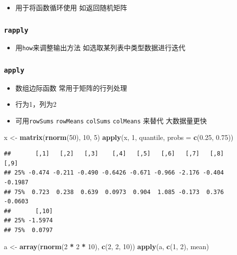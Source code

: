 \documentclass[]{book}
\newenvironment{Shaded}{\begin{snugshade}}{\end{snugshade}}
\newcommand{\DataTypeTok}[1]{\textcolor[rgb]{0.13,0.29,0.53}{#1}}
\newcommand{\DecValTok}[1]{\textcolor[rgb]{0.00,0.00,0.81}{#1}}
\newcommand{\FloatTok}[1]{\textcolor[rgb]{0.00,0.00,0.81}{#1}}
\newcommand{\KeywordTok}[1]{\textcolor[rgb]{0.13,0.29,0.53}{\textbf{#1}}}
\newcommand{\NormalTok}[1]{#1}
\newcommand{\OperatorTok}[1]{\textcolor[rgb]{0.81,0.36,0.00}{\textbf{#1}}}
\newcommand{\StringTok}[1]{\textcolor[rgb]{0.31,0.60,0.02}{#1}}
\providecommand{\tightlist}{%
  \setlength{\itemsep}{0pt}\setlength{\parskip}{0pt}}
\begin{document}
\begin{itemize}
\tightlist
\item
  用于将函数循环使用 如返回随机矩阵
\end{itemize}

\hypertarget{rapply}{%
\subsubsection{\texorpdfstring{\texttt{rapply}}{rapply}}\label{rapply}}

\begin{itemize}
\tightlist
\item
  用\texttt{how}来调整输出方法 如选取某列表中类型数据进行迭代
\end{itemize}

\hypertarget{apply}{%
\subsubsection{\texorpdfstring{\texttt{apply}}{apply}}\label{apply}}

\begin{itemize}
\tightlist
\item
  数组边际函数 常用于矩阵的行列处理
\item
  行为1，列为2
\item
  可用\texttt{rowSums} \texttt{rowMeans} \texttt{colSums} \texttt{colMeans} 来替代 大数据量更快
\end{itemize}

\begin{Shaded}
\begin{Highlighting}[]
\NormalTok{x <-}\StringTok{ }\KeywordTok{matrix}\NormalTok{(}\KeywordTok{rnorm}\NormalTok{(}\DecValTok{50}\NormalTok{), }\DecValTok{10}\NormalTok{, }\DecValTok{5}\NormalTok{)}
\KeywordTok{apply}\NormalTok{(x, }\DecValTok{1}\NormalTok{, quantile, }\DataTypeTok{probs =} \KeywordTok{c}\NormalTok{(}\FloatTok{0.25}\NormalTok{, }\FloatTok{0.75}\NormalTok{))}
\end{Highlighting}
\end{Shaded}

\begin{verbatim}
##       [,1]   [,2]   [,3]    [,4]   [,5]   [,6]   [,7]   [,8]    [,9]
## 25% -0.474 -0.211 -0.490 -0.6426 -0.671 -0.966 -2.176 -0.404 -0.1987
## 75%  0.723  0.238  0.639  0.0973  0.904  1.085 -0.173  0.376 -0.0603
##       [,10]
## 25% -1.5974
## 75%  0.0797
\end{verbatim}

\begin{Shaded}
\begin{Highlighting}[]
\NormalTok{a <-}\StringTok{ }\KeywordTok{array}\NormalTok{(}\KeywordTok{rnorm}\NormalTok{(}\DecValTok{2} \OperatorTok{*}\StringTok{ }\DecValTok{2} \OperatorTok{*}\StringTok{ }\DecValTok{10}\NormalTok{), }\KeywordTok{c}\NormalTok{(}\DecValTok{2}\NormalTok{, }\DecValTok{2}\NormalTok{, }\DecValTok{10}\NormalTok{))}
\KeywordTok{apply}\NormalTok{(a, }\KeywordTok{c}\NormalTok{(}\DecValTok{1}\NormalTok{, }\DecValTok{2}\NormalTok{), mean)}
\end{Highlighting}
\end{Shaded}
\end{document}
